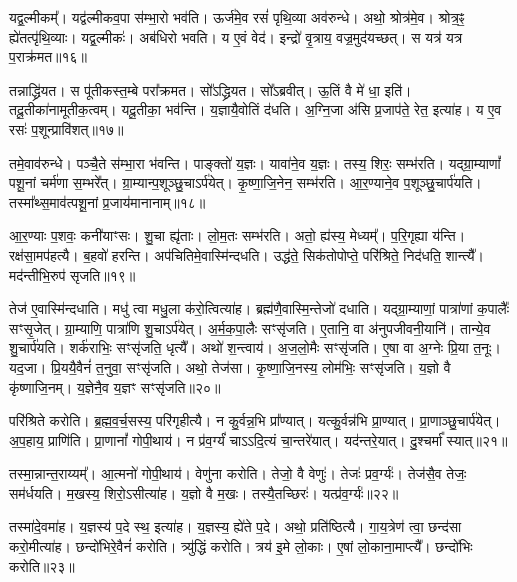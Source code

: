 यद्व॒ल्मीकम्᳚। 
यद्व॑ल्मीकव॒पा स॑म्भा॒रो भव॑ति। 
ऊर्ज॑मे॒व रसं॑ पृथि॒व्या अव॑रुन्धे। 
अथो॒ श्रोत्र॑मे॒व। 
श्रोत्र॒ꣴ॒ ह्ये॑तत्पृ॑थि॒व्याः। 
यद्व॒ल्मीकः॑। 
अब॑धिरो भवति। 
य ए॒वं वेद॑। 
इन्द्रो॑ वृ॒त्राय॒ वज्र॒मुद॑यच्छत्। 
स यत्र॑ यत्र प॒राक्र॑मत॥१६॥

तन्नाद्ध्रि॑यत। 
स पू॑तीकस्त॒म्बे परा᳚क्रमत। 
सो᳚ऽद्ध्रियत। 
सो᳚ऽब्रवीत्। 
ऊ॒तिं वै मे॑ धा॒ इति॑। 
तदू॒तीका॑नामूतीक॒त्वम्। 
यदू॒तीका॒ भव॑न्ति। 
य॒ज्ञायै॒वोतिं द॑धति। 
अ॒ग्नि॒जा अ॑सि प्र॒जाप॑ते॒ रेत॒ इत्या॑ह। 
य ए॒व रसः॑ प॒शून्प्रावि॑शत्॥१७॥

तमे॒वाव॑रुन्धे। 
पञ्चै॒ते स॑म्भा॒रा भ॑वन्ति। 
पाङ्क्तो॑ य॒ज्ञः। 
यावा॑ने॒व य॒ज्ञः। 
तस्य॒ शिरः॒ सम्भ॑रति। 
यद्ग्रा॒म्याणां᳚ पशू॒नां चर्म॑णा स॒म्भरे᳚त्। 
ग्रा॒म्यान्प॒शूञ्छु॒चाऽर्प॑येत्। 
कृ॒ष्णा॒जि॒नेन॒ सम्भ॑रति। 
आ॒र॒ण्याने॒व प॒शूञ्छु॒चार्प॑यति। 
तस्मा᳚थ्स॒माव॑त्पशू॒नां प्र॒जाय॑मानानाम्॥१८॥

आ॒र॒ण्याः प॒शवः॒ कनी॑याꣳसः। 
शु॒चा ह्यृ॑ताः। 
लो॒म॒तः सम्भ॑रति। 
अतो॒ ह्य॑स्य॒ मेध्यम्᳚। 
प॒रि॒गृह्या य॑न्ति। 
रक्ष॑सा॒मप॑हत्यै। 
ब॒हवो॑ हरन्ति। 
अप॑चितिमे॒वास्मि॑न्दधति। 
उद्ध॑ते॒ सिक॑तोपोप्ते॒ परि॑श्रिते॒ निद॑धति॒ शान्त्यै᳚। 
मद॑न्तीभि॒रुप॑ सृजति॥१९॥

तेज॑ ए॒वास्मि॑न्दधाति। 
मधु॑ त्वा मधु॒ला क॑रो॒त्वित्या॑ह। 
ब्रह्म॑णै॒वास्मि॒न्तेजो॑ दधाति। 
यद्ग्रा॒म्याणां॒ पात्रा॑णां क॒पालैः᳚ सꣳसृ॒जेत्। 
ग्रा॒म्याणि॒ पात्रा॑णि शु॒चाऽर्प॑येत्। 
अ॒र्म॒क॒पा॒लैः सꣳसृ॑जति। 
ए॒तानि॒ वा अ॑नुपजीवनी॒यानि॑। 
तान्ये॒व शु॒चार्प॑यति। 
शर्क॑राभिः॒ सꣳसृ॑जति॒ धृत्यै᳚। 
अथो॑ श॒न्त्वाय॑। 
अ॒ज॒लो॒मैः सꣳसृ॑जति। 
ए॒षा वा अ॒ग्नेः प्रि॒या त॒नूः। 
यद॒जा। 
प्रि॒ययै॒वैनं॑ त॒नुवा॒ सꣳसृ॑जति। 
अथो॒ तेज॑सा। 
कृ॒ष्णा॒जि॒नस्य॒ लोम॑भिः॒ सꣳसृ॑जति। 
य॒ज्ञो वै कृ॑ष्णाजि॒नम्। 
य॒ज्ञेनै॒व य॒ज्ञꣳ सꣳसृ॑जति॥२०॥
\anuvakamend[या॒ज्या॑यै॒ न जु॑हु॒यादवि॑श॒द्वेणुः॒ शान्त्यै॑ प॒ङ्क्तिरा॑धस॒मित्या॑ह हरति दिहन्ति प॒राक्र॑म॒तावि॑शत् प्र॒जाय॑मानानाꣳ सृजति श॒न्त्वाया॒ष्टौ च॑]

परि॑श्रिते करोति। 
ब्र॒ह्म॒व॒र्च॒सस्य॒ परि॑गृहीत्यै। 
न कु॒र्वन्न॒भि प्रा᳚ण्यात्। 
यत्कु॒र्वन्न॑भि प्रा॒ण्यात्। 
प्रा॒णाञ्छु॒चार्प॑येत्। 
अ॒प॒हाय॒ प्राणि॑ति। 
प्रा॒णानां᳚ गोपी॒थाय॑। 
न प्र॑व॒र्ग्यं॑ चाऽऽदि॒त्यं चा॒न्तरे॑यात्। 
यद॑न्तरे॒यात्। 
दु॒श्चर्मा᳚ स्यात्॥२१॥

तस्मा॒न्नान्त॒राय्यम्᳚। 
आ॒त्मनो॑ गोपी॒थाय॑। 
वेणु॑ना करोति। 
तेजो॒ वै वेणुः॑। 
तेजः॑ प्रव॒र्ग्यः॑। 
तेज॑सै॒व तेजः॒ सम॑र्धयति। 
म॒खस्य॒ शिरो॒ऽसीत्या॑ह। 
य॒ज्ञो वै म॒खः। 
तस्यै॒तच्छिरः॑। 
यत्प्र॑व॒र्ग्यः॑॥२२॥

तस्मा॑दे॒वमा॑ह। 
य॒ज्ञस्य॑ प॒दे स्थ॒ इत्या॑ह। 
य॒ज्ञस्य॒ ह्ये॑ते प॒दे। 
अथो॒ प्रति॑ष्ठित्यै। 
गा॒य॒त्रेण॑ त्वा॒ छन्द॑सा करो॒मीत्या॑ह। 
छन्दो॑भिरे॒वैनं॑ करोति। 
त्र्यु॑द्धिं करोति। 
त्रय॑ इ॒मे लो॒काः। 
ए॒षां लो॒काना॒माप्त्यै᳚। 
छन्दो॑भिः करोति॥२३॥

